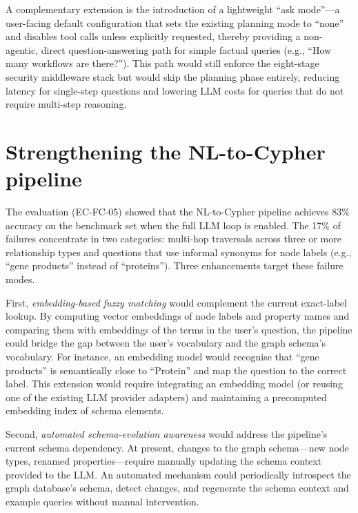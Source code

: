 \documentclass[a4paper]{sapthesis}
\begin{document}
A complementary extension is the introduction of a lightweight ``ask
mode''---a user-facing default configuration that sets the existing
planning mode to ``none'' and disables tool calls unless explicitly
requested, thereby providing a non-agentic, direct question-answering
path for simple factual queries (e.g., ``How many workflows are
there?'').  This path would still enforce the eight-stage security
middleware stack but would skip the planning phase entirely, reducing
latency for single-step questions and lowering LLM costs for queries
that do not require multi-step reasoning.

\section{Strengthening the NL-to-Cypher pipeline}
\label{sec:fw-nl-cypher}

The evaluation (EC-FC-05) showed that the NL-to-Cypher pipeline achieves
83\% accuracy on the benchmark set when the full LLM loop is enabled.
The 17\% of failures concentrate in two categories: multi-hop traversals
across three or more relationship types and questions that use informal
synonyms for node labels (e.g., ``gene products'' instead of
``proteins'').  Three enhancements target these failure modes.

First, \emph{embedding-based fuzzy matching} would complement the current
exact-label lookup.  By computing vector embeddings of node labels and
property names and comparing them with embeddings of the terms in the
user's question, the pipeline could bridge the gap between the user's
vocabulary and the graph schema's vocabulary.  For instance, an embedding
model would recognise that ``gene products'' is semantically close to
``Protein'' and map the question to the correct label.  This extension
would require integrating an embedding model (or reusing one of the
existing LLM provider adapters) and maintaining a precomputed embedding
index of schema elements.

Second, \emph{automated schema-evolution awareness} would address the
pipeline's current schema dependency.  At present, changes to the graph
schema---new node types, renamed properties---require manually updating
the schema context provided to the LLM.  An automated mechanism could
periodically introspect the graph database's schema, detect changes, and
regenerate the schema context and example queries without manual
intervention.
\end{document}
